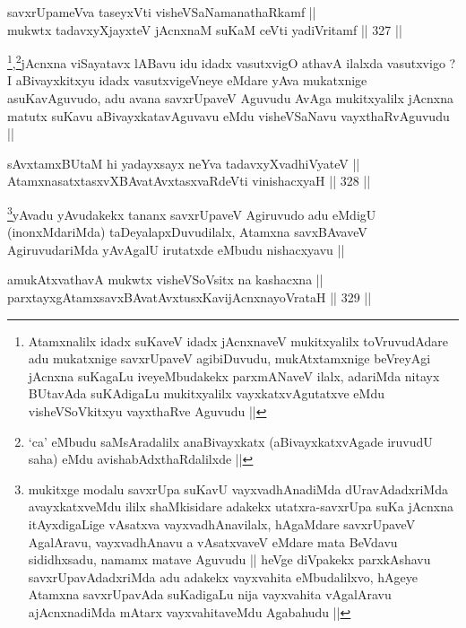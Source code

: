 \begin{shl}
savxrUpameVva taseyxVti visheVSaNamanathaRkamf || \\
mukwtx tadavxyXjayxteV jAcnxnaM suKaM ceVti yadiVritamf ||  327 ||  
\end{shl}

\begin{artha}
\footnote{Atamxnalilx idadx suKaveV idadx jAcnxnaveV mukitxyalilx
  toVruvudAdare adu mukatxnige savxrUpaveV agibiDuvudu, mukAtxtamxnige
beVreyAgi jAcnxna suKagaLu iveyeMbudakekx parxmANaveV ilalx, adariMda
nitayx BUtavAda suKAdigaLu mukitxyalilx vayxkatxvAgutatxve eMdu
visheVSoVkitxyu vayxthaRve Aguvudu ||},\footnote{`ca' eMbudu
  saMsAradalilx anaBivayxkatx (aBivayxkatxvAgade iruvudU saha) eMdu
  avishabAdxthaRdalilxde ||}jAcnxna viSayatavx lABavu idu idadx vasutxvigO athavA
ilalxda vasutxvigo ? I aBivayxkitxyu idadx vasutxvigeVneye eMdare yAva
mukatxnige asuKavAguvudo, adu avana savxrUpaveV Aguvudu AvAga
mukitxyalilx jAcnxna matutx suKavu aBivayxkatavAguvavu eMdu
visheVSaNavu vayxthaRvAguvudu ||
\end{artha}

\begin{shl}
sAvxtamxBUtaM hi yadayxsayx neYva tadavxyXvadhiVyateV || \\
AtamxnasatxtasxvXBAvatAvxtasxvaRdeVti vinishacxyaH ||  328 ||  
\end{shl}

\begin{artha}
\footnote{mukitxge modalu savxrUpa suKavU vayxvadhAnadiMda
  dUravAdadxriMda avayxkatxveMdu ililx shaMkisidare adakekx
  utatxra-savxrUpa suKa jAcnxna itAyxdigaLige vAsatxva
  vayxvadhAnavilalx, hAgaMdare savxrUpaveV AgalAravu, vayxvadhAnavu a
  vAsatxvaveV eMdare mata BeVdavu sididhxsadu, namamx matave Aguvudu
  || heVge diVpakekx parxkAshavu savxrUpavAdadxriMda adu adakekx
  vayxvahita eMbudalilxvo, hAgeye Atamxna savxrUpavAda suKadigaLu nija
vayxvahita vAgalAravu ajAcnxnadiMda mAtarx vayxvahitaveMdu Agabahudu ||}yAvadu yAvudakekx tananx savxrUpaveV Agiruvudo adu eMdigU
(inonxMdariMda) taDeyalapxDuvudilalx, Atamxna savxBAvaveV
AgiruvudariMda yAvAgalU irutatxde eMbudu nishacxyavu ||
\end{artha}


\begin{shl}
amukAtxvathavA mukwtx visheVSoV\s sitx na kashacxna || \\
parxtayxgAtamxsavxBAvatAvxtusxKavijAcnxnayoVrataH ||  329 ||  
\end{shl}
				

